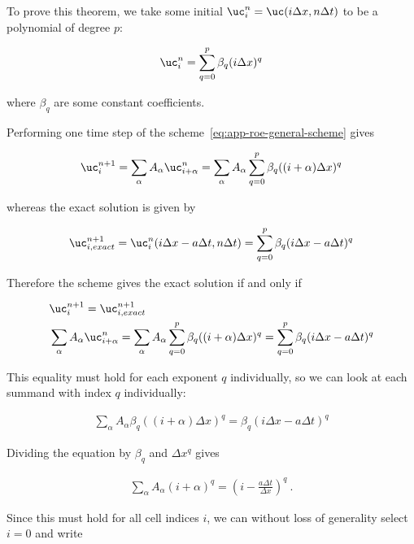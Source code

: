 To prove this theorem, we take some initial $\uc_i^{n} = \uc(i \Delta x, n \Delta t)$ to be a
polynomial of degree $p$:

\begin{align}
    \uc_i^{n} = \sum_{q = 0}^p \beta_q (i \Delta x)^q
\end{align}

where $\beta_q$ are some constant coefficients.

Performing one time step of the scheme~\ref{eq:app-roe-general-scheme} gives

\begin{align}
 \uc_i^{n+1}
    = \sum_\alpha A_\alpha \uc_{i+\alpha}^n
    =  \sum_\alpha A_\alpha \sum_{q = 0}^p \beta_q ((i + \alpha) \Delta x)^q
\end{align}

whereas the exact solution is given by

\begin{align}
\uc_{i,exact}^{n+1}
    = \uc_{i}^{n} (i \Delta x - a \Delta t, n \Delta t)
    = \sum_{q = 0}^p \beta_q (i \Delta x - a \Delta t)^q
\end{align}

Therefore the scheme gives the exact solution if and only if

\begin{align}
    &\uc_i^{n+1} = \uc_{i, exact}^{n+1} \\
    &\sum_\alpha A_\alpha \uc_{i+\alpha}^n =
    \sum_\alpha A_\alpha \sum_{q = 0}^p \beta_q ((i + \alpha) \Delta x)^q
    = \sum_{q = 0}^p \beta_q (i \Delta x - a \Delta t)^q
\end{align}

This equality must hold for each exponent $q$ individually, so we can look at each
summand with index $q$ individually:


\begin{align}
\sum_\alpha A_\alpha \beta_q ((i + \alpha) \Delta x)^q = \beta_q (i \Delta x - a \Delta t)^q
\end{align}

Dividing the equation by $\beta_q$ and $\Delta x^q$ gives


\begin{align}
\sum_\alpha A_\alpha (i + \alpha)^q = \left(i - \frac{a \Delta t}{\Delta x}\right)^q \ .
\end{align}

Since this must hold for all cell indices $i$, we can without loss of generality select $i = 0$ and
write


